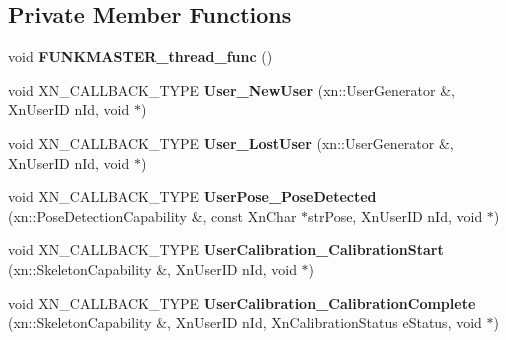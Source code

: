 \subsection*{Private Member Functions}
\begin{DoxyCompactItemize}
\item 
\hypertarget{class_tiem_spelchk_1_1_lurn2_spiel_nub_a28fa0e11dc89f2202890ec873a74d23f}{void {\bfseries F\-U\-N\-K\-M\-A\-S\-T\-E\-R\-\_\-thread\-\_\-func} ()}\label{class_tiem_spelchk_1_1_lurn2_spiel_nub_a28fa0e11dc89f2202890ec873a74d23f}

\item 
\hypertarget{class_tiem_spelchk_1_1_lurn2_spiel_nub_aa28206499ebeb98e2db24db9813232f7}{void X\-N\-\_\-\-C\-A\-L\-L\-B\-A\-C\-K\-\_\-\-T\-Y\-P\-E {\bfseries User\-\_\-\-New\-User} (xn\-::\-User\-Generator \&, Xn\-User\-I\-D n\-Id, void $\ast$)}\label{class_tiem_spelchk_1_1_lurn2_spiel_nub_aa28206499ebeb98e2db24db9813232f7}

\item 
\hypertarget{class_tiem_spelchk_1_1_lurn2_spiel_nub_a040124fb9e20cfab39c45d334e6c5b1c}{void X\-N\-\_\-\-C\-A\-L\-L\-B\-A\-C\-K\-\_\-\-T\-Y\-P\-E {\bfseries User\-\_\-\-Lost\-User} (xn\-::\-User\-Generator \&, Xn\-User\-I\-D n\-Id, void $\ast$)}\label{class_tiem_spelchk_1_1_lurn2_spiel_nub_a040124fb9e20cfab39c45d334e6c5b1c}

\item 
\hypertarget{class_tiem_spelchk_1_1_lurn2_spiel_nub_a5bc3222dbbbee803b2b77afbdbd88acc}{void X\-N\-\_\-\-C\-A\-L\-L\-B\-A\-C\-K\-\_\-\-T\-Y\-P\-E {\bfseries User\-Pose\-\_\-\-Pose\-Detected} (xn\-::\-Pose\-Detection\-Capability \&, const Xn\-Char $\ast$str\-Pose, Xn\-User\-I\-D n\-Id, void $\ast$)}\label{class_tiem_spelchk_1_1_lurn2_spiel_nub_a5bc3222dbbbee803b2b77afbdbd88acc}

\item 
\hypertarget{class_tiem_spelchk_1_1_lurn2_spiel_nub_aaf9264a46a4b2c23587fc67569339992}{void X\-N\-\_\-\-C\-A\-L\-L\-B\-A\-C\-K\-\_\-\-T\-Y\-P\-E {\bfseries User\-Calibration\-\_\-\-Calibration\-Start} (xn\-::\-Skeleton\-Capability \&, Xn\-User\-I\-D n\-Id, void $\ast$)}\label{class_tiem_spelchk_1_1_lurn2_spiel_nub_aaf9264a46a4b2c23587fc67569339992}

\item 
\hypertarget{class_tiem_spelchk_1_1_lurn2_spiel_nub_ad029dba23118fdb5fa2b2cfc74a50305}{void X\-N\-\_\-\-C\-A\-L\-L\-B\-A\-C\-K\-\_\-\-T\-Y\-P\-E {\bfseries User\-Calibration\-\_\-\-Calibration\-Complete} (xn\-::\-Skeleton\-Capability \&, Xn\-User\-I\-D n\-Id, Xn\-Calibration\-Status e\-Status, void $\ast$)}\label{class_tiem_spelchk_1_1_lurn2_spiel_nub_ad029dba23118fdb5fa2b2cfc74a50305}

\end{DoxyCompactItemize}
